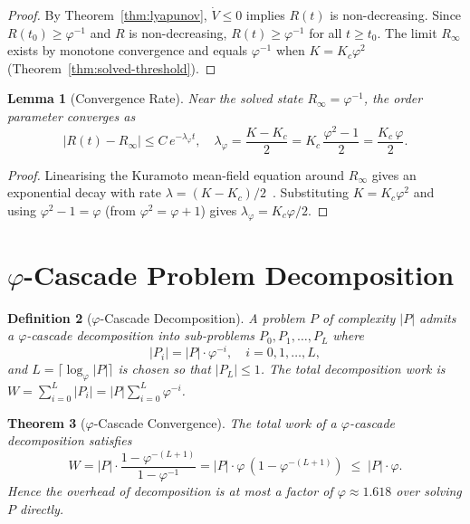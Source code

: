 \documentclass[12pt]{article}
\newtheorem{theorem}{Theorem}
\newtheorem{lemma}[theorem]{Lemma}
\newtheorem{definition}[theorem]{Definition}
\newcommand{\PHI}{\varphi}
\newcommand{\PHIINV}{\varphi^{-1}}
\begin{document}
\begin{proof}
By Theorem~\ref{thm:lyapunov}, $\dot{V} \le 0$ implies $R(t)$ is
non-decreasing.  Since $R(t_0) \ge \PHIINV$ and $R$ is non-decreasing,
$R(t) \ge \PHIINV$ for all $t \ge t_0$.  The limit $R_\infty$ exists by
monotone convergence and equals $\PHIINV$ when $K = K_c\PHI^2$
(Theorem~\ref{thm:solved-threshold}).
\end{proof}

\begin{lemma}[Convergence Rate]
\label{lem:rate}
Near the solved state $R_\infty = \PHIINV$, the order parameter converges as
\[
  |R(t) - R_\infty| \le C\,e^{-\lambda_\PHI t},
  \quad \lambda_\PHI = \frac{K - K_c}{2} = K_c\,\frac{\PHI^2 - 1}{2} =
  \frac{K_c\,\PHI}{2}.
\]
\end{lemma}

\begin{proof}
Linearising the Kuramoto mean-field equation around $R_\infty$ gives an
exponential decay with rate $\lambda = (K - K_c)/2$~\cite{Strogatz2000}.
Substituting $K = K_c\PHI^2$ and using $\PHI^2 - 1 = \PHI$ (from $\PHI^2 =
\PHI + 1$) gives $\lambda_\PHI = K_c\PHI/2$.
\end{proof}

\section{$\varphi$-Cascade Problem Decomposition}
\label{sec:cascade}

\begin{definition}[$\varphi$-Cascade Decomposition]
\label{def:phi-cascade}
A problem $P$ of complexity $|P|$ admits a \emph{$\varphi$-cascade
decomposition} into sub-problems $P_0, P_1, \ldots, P_L$ where
\[
  |P_i| = |P| \cdot \PHI^{-i}, \quad i = 0, 1, \ldots, L,
\]
and $L = \lceil \log_\PHI |P| \rceil$ is chosen so that $|P_L| \le 1$.
The total decomposition work is $W = \sum_{i=0}^{L} |P_i| = |P|
\sum_{i=0}^{L}\PHI^{-i}$.
\end{definition}

\begin{theorem}[$\varphi$-Cascade Convergence]
\label{thm:cascade}
The total work of a $\varphi$-cascade decomposition satisfies
\[
  W = |P| \cdot \frac{1 - \PHI^{-(L+1)}}{1 - \PHIINV} = |P| \cdot \PHI\,(1 -
  \PHI^{-(L+1)}) \;\le\; |P| \cdot \PHI.
\]
Hence the overhead of decomposition is at most a factor of $\PHI \approx 1.618$
over solving $P$ directly.
\end{theorem}
\end{document}
